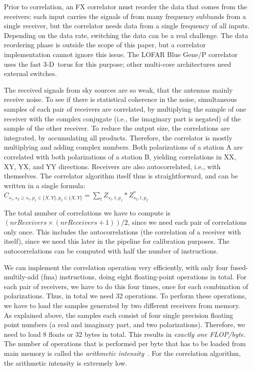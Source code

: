 \documentclass{article}
\begin{document}
Prior to correlation, an FX correlator must reorder the data that comes from
the receivers:
each input carries the signals of from many frequency subbands from a single
receiver, but the correlator needs data from a single frequency of all inputs.
Depending on the data rate, switching the data can be a real challenge.
The data reordering phase is outside the scope of this paper, but a correlator
implementation cannot ignore this issue.
The LOFAR Blue Gene/P correlator uses the fast 3-D~torus for this purpose;
other multi-core architectures need external switches.

The received signals from sky sources are so weak, that the antennas 
mainly receive noise. To see if there is statistical coherence
in the noise, simultaneous samples of each pair of receivers are correlated, 
by multiplying the sample of one receiver with the complex
conjugate (i.e., the imaginary part is negated) of the sample of the other receiver.
To reduce the output size, the correlations are integrated, by accumulating all products. 
Therefore, the correlator is mostly multiplying and adding complex numbers.
Both polarizations of a station A are correlated with both polarizations 
of a station B, yielding correlations in XX, XY, YX, and YY
directions. Receivers are also autocorrelated, i.e., with
themselves. 
The correlator algorithm itself thus is straightforward, and can be
written in a single formula: \\
$C_{s_1,s_2\geq s_1,p_1\in\{X,Y\},p_2\in\{X,Y\}} = \displaystyle\sum_{t} Z_{s_1,t,p_1} * Z_{s_2,t,p_2}^\ast$ 

The total number of correlations we have to compute is $(nrReceivers \times
(nrReceivers + 1)) / 2$, since we need each pair of correlations only
once. This includes the autocorrelations (the correlation of a receiver with itself),
since we need this later in the pipeline for calibration purposes.
The autocorrelations can be computed with half the number of instructions.

We can implement the correlation operation very efficiently, with only
four fused-multily-add (fma) instructions, doing eight floating-point operations in
total. For each pair of receivers, we have to do this four times, once
for each combination of polarizations. Thus, in total we need 32
operations. To perform these operations, we have to load the samples generated by two different receivers from memory.
As explained above, the samples each consist of four single precision floating point numbers (a real and imaginary part, and two polarizations).
Therefore, we need to load 8 floats or 32 bytes in total.
This results in \emph{exactly one FLOP/byte}.  The number of operations that is performed per byte
that has to be loaded from main memory is called the \emph{arithmetic intensity}~\cite{system-performance}. 
For the correlation algorithm,
the arithmetic intensity is extremely low.
\end{document}
